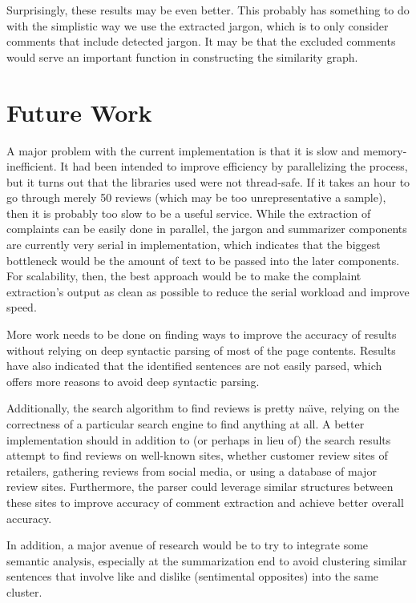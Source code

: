 \documentclass{article}
\begin{document}
Surprisingly, these results may be even better. This probably has something to
do with the simplistic way we use the extracted jargon, which is to only
consider comments that include detected jargon. It may be that the excluded
comments would serve an important function in constructing the similarity
graph.

\section{Future Work}

A major problem with the current implementation is that it is slow and memory-
inefficient. It had been intended to improve efficiency by parallelizing the
process, but it turns out that the libraries used were not thread-safe. If it
takes an hour to go through merely 50 reviews (which may be too unrepresentative
a sample), then it is probably too slow to be a useful service. While the
extraction of complaints can be easily done in parallel, the jargon and
summarizer components are currently very serial in implementation, which
indicates that the biggest bottleneck would be the amount of text to be passed
into the later components. For scalability, then, the best approach would be to
make the complaint extraction's output as clean as possible to reduce the
serial workload and improve speed.

More
work needs to be done on finding ways to improve the accuracy of results
without relying on deep syntactic parsing of most of the page contents. Results
have also indicated that the identified sentences are not easily parsed, which
offers more reasons to avoid deep syntactic parsing.

Additionally, the search algorithm to find reviews is pretty na\"{\i}ve,
relying on the correctness of a particular search engine to find anything at
all. A better implementation should in addition to (or perhaps in lieu of) the
search results attempt to find reviews on well-known sites, whether customer
review sites of retailers, gathering reviews from social media, or using a
database of major review sites. Furthermore, the parser could leverage similar
structures between these sites to improve accuracy of comment extraction and
achieve better overall accuracy.

In addition, a major avenue of research would be to try to integrate some
semantic analysis, especially at the summarization end to avoid clustering
similar sentences that involve like and dislike (sentimental opposites) into
the same cluster.
\end{document}
